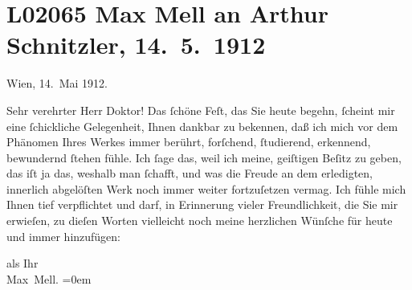 

\section[Max Mell an Arthur Schnitzler, 14. 5. 1912]{L02065 Max Mell an Arthur Schnitzler, 14. 5. 1912}
\nopagebreak{}
\rehead{ }\normalsize\beginnumbering{}
\toendnotes[C]{\smallbreak\pagebreak[2]}
\toendnotes[C]{\smallbreak}
\pstart
           \raggedleft{}{\pb}Wien, 14. Mai 1912.\pend
           
\pstart{}Sehr verehrter Herr Doktor!\pend\vspace{0.5em}
\pstart
           Das{ }ſchöne Feſt, das Sie heute begehn,{ }ſcheint mir eine{ }ſchickliche Gelegenheit,
               Ihnen dankbar zu bekennen, daß ich mich vor dem Phänomen Ihres Werkes immer berührt,
               forſchend,{ }ſtudierend, erkennend, bewundernd{ }ſtehen fühle. Ich{ }ſage das, weil ich
               meine, geiſtigen Beſitz zu geben, das iſt ja das, weshalb man{ }ſchafft, und was die
               Freude an dem erledigten, innerlich abgelöſten Werk noch immer weiter fortzuſetzen
               vermag. Ich fühle mich Ihnen tief verpflichtet und darf, in Erinnerung vieler
               Freundlichkeit, die Sie mir erwieſen, zu dieſen Worten vielleicht noch meine
               herzlichen Wünſche für heute und immer hinzufügen:\pend
           
\pstart
           als Ihr{\\[\baselineskip]}\spacefill\mbox{Max Mell.}\pend
           \leftskip=0em{}\endnumbering{}  \newcommand{\dateiname}{L02065}\newcommand{\titel}{Max Mell an Arthur Schnitzler, 14. 5. 1912}\newcommand{\editorInnen}{Martin Anton Müller und Gerd-Hermann Susen}
